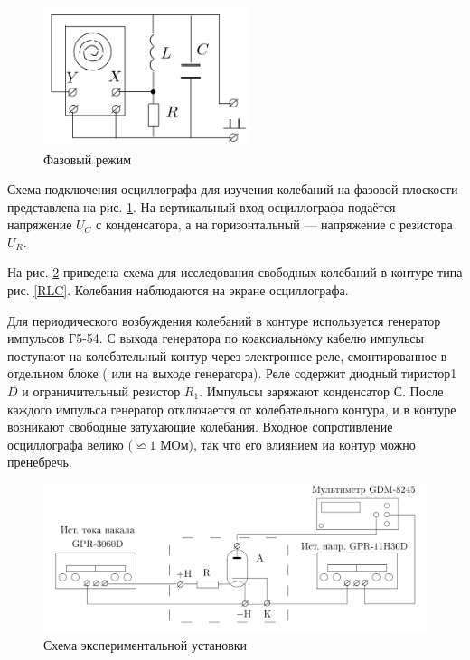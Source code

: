 \documentclass[a4paper, 12pt]{article}
\begin{document}
    \begin{figure} 
        \includegraphics[width=6cm]{Fase}
        \caption{Фазовый режим}
        \label{Fase}
    \end{figure}

    Схема подключения осциллографа для изучения колебаний на фазовой плоскости представлена на рис. \ref{Fase}. На вертикальный вход осциллографа подаётся напряжение $ U_C $ с конденсатора, а на горизонтальный --- напряжение с резистора $ U_R $.

    На рис. \ref{lab} приведена схема для исследования свободных колебаний в контуре типа рис. \ref{RLC}. Колебания наблюдаются на экране осциллографа.

    Для периодического возбуждения колебаний в контуре используется
    генератор импульсов Г5-54. С выхода генератора по коаксиальному кабелю импульсы поступают на колебательный контур через электронное
    реле, смонтированное в отдельном блоке ( или на выходе генератора).
    Реле содержит диодный тиристор1 $ D $ и ограничительный резистор $ R_1 $.
    Импульсы заряжают конденсатор $ С $. После каждого импульса генератор
    отключается от колебательного контура, и в контуре возникают
    свободные затухающие колебания. Входное сопротивление осциллографа
    велико ($ \backsimeq 1$ МОм), так что его влиянием иа контур можно пренебречь.

    \begin{figure}[h]
        \includegraphics[width=15cm]{lab}
        \caption{Схема экспериментальной установки}
        \label{lab}
    \end{figure}
\end{document}

